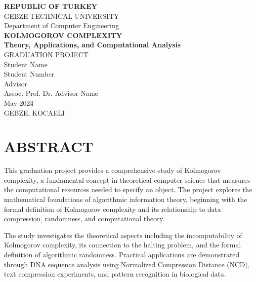 \documentclass[12pt,a4paper]{report}
\begin{document}
\begin{titlepage}
    \centering
    \vspace*{2cm}
    {\Large \textbf{REPUBLIC OF TURKEY}\\
    GEBZE TECHNICAL UNIVERSITY\\
    \vspace{0.5cm}
    Department of Computer Engineering\\}
    \vfill
    {\huge \textbf{KOLMOGOROV COMPLEXITY}\\
    \vspace{0.5cm}
    \Large \textbf{Theory, Applications, and Computational Analysis}\\}
    \vfill
    {\Large GRADUATION PROJECT\\}
    \vspace{1cm}
    {\large Student Name\\
    Student Number\\}
    \vspace{1cm}
    {\large Advisor\\
    Assoc. Prof. Dr. Advisor Name\\}
    \vspace{2cm}
    {\large May 2024\\
    GEBZE, KOCAELI}
\end{titlepage}

\setcounter{page}{1}

\chapter*{ABSTRACT}

This graduation project provides a comprehensive study of Kolmogorov complexity, a fundamental concept in theoretical computer science that measures the computational resources needed to specify an object. The project explores the mathematical foundations of algorithmic information theory, beginning with the formal definition of Kolmogorov complexity and its relationship to data compression, randomness, and computational theory.

The study investigates the theoretical aspects including the incomputability of Kolmogorov complexity, its connection to the halting problem, and the formal definition of algorithmic randomness. Practical applications are demonstrated through DNA sequence analysis using Normalized Compression Distance (NCD), text compression experiments, and pattern recognition in biological data.
\end{document}
